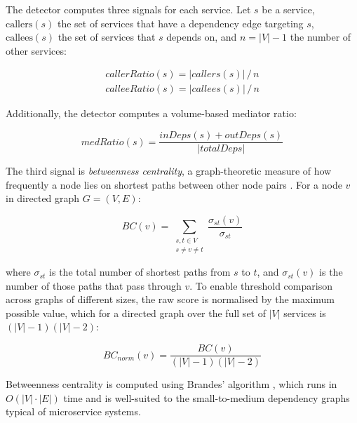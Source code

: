 The detector computes three signals for each service. Let $s$ be a service, $\text{callers}(s)$ the set of services that have a dependency edge targeting $s$, $\text{callees}(s)$ the set of services that $s$ depends on, and $n = |V| - 1$ the number of other services:

\begin{equation}
    \begin{array}{l}
        \mathit{callerRatio}(s) = |\mathit{callers}(s)|\, /\, n \\[6pt]
        \mathit{calleeRatio}(s) = |\mathit{callees}(s)|\, /\, n
    \end{array}
    \label{eq:esb-ratios}
\end{equation}

Additionally, the detector computes a volume-based mediator ratio:

\begin{equation}
    \mathit{medRatio}(s) = \frac{\mathit{inDeps}(s) + \mathit{outDeps}(s)}{|\mathit{totalDeps}|}
    \label{eq:esb-mediator-ratio}
\end{equation}

The third signal is \textit{betweenness centrality}, a graph-theoretic measure of how frequently a node lies on shortest paths between other node pairs \cite{Brandes2001}. For a node $v$ in directed graph $G = (V, E)$:

\begin{equation}
    BC(v) = \sum_{\substack{s,t \in V \\ s \neq v \neq t}} \frac{\sigma_{st}(v)}{\sigma_{st}}
    \label{eq:betweenness-centrality}
\end{equation}

\noindent where $\sigma_{st}$ is the total number of shortest paths from $s$ to $t$, and $\sigma_{st}(v)$ is the number of those paths that pass through $v$. To enable threshold comparison across graphs of different sizes, the raw score is normalised by the maximum possible value, which for a directed graph over the full set of $|V|$ services is $(|V|-1)(|V|-2)$:

\begin{equation}
    BC_{\mathit{norm}}(v) = \frac{BC(v)}{(|V|-1)(|V|-2)}
    \label{eq:betweenness-norm}
\end{equation}

\noindent Betweenness centrality is computed using Brandes' algorithm \cite{Brandes2001}, which runs in $O(|V| \cdot |E|)$ time and is well-suited to the small-to-medium dependency graphs typical of microservice systems.

